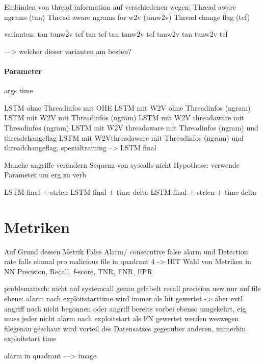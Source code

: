             Einbinden von thread information auf verschiedenen wegen:
            Thread aware ngrams (tan)
            Thread aware ngrams for w2v (tanw2v)
            Thread change flag (tcf)

            varianten:
            tan
            tanw2v
            tcf
            tan tcf
            tan tanw2v
            tcf tanw2v
            tan tanw2v tcf

            ---> welcher dieser varianten am besten?

        \paragraph{Parameter}
            args
            time

            LSTM ohne Threadinfos mit OHE
            LSTM mit W2V ohne Threadinfos (ngram)
            LSTM mit W2V mit Threadinfos (ngram)
            LSTM mit W2V threadaware mit Threadinfos (ngram)
            LSTM mit W2V threadaware mit Threadinfos (ngram) und threadchangeflag
            LSTM mit W2Vthreadaware mit Threadinfos (ngram) und threadchangeflag, spezialtraining
            --> LSTM final

            Manche angriffe verändern Sequenz von syscalls nicht
            Hypothese:
            verwende Parameter um erg zu verb

            LSTM final + strlen
            LSTM final + time delta
            LSTM final + strlen + time delta



\section{Metriken}\label{sec:Metriken}

    Auf Grund dessen Metrik False Alarm/ consecutive false alarm und Detection rate falls einmal pro malicious file in quadrant 4 -> HIT
    Wahl von Metriken in NN
    Precision, Recall, f-score, TNR, FNR, FPR

    problematisch:
    nicht auf systemcall genau gelabelt
    recall precision usw nur auf file ebene:
    alarm nach exploitstarttime wird immer als hit gewertet -> aber evtl angriff noch nicht begonnen
    oder angriff bereits vorbei
    ebenso umgekehrt, eig muss jeder nicht alarm nach exploitstart als FN gewertet werden
    weswegen filegenau geschaut wird
    vorteil des Datensatzes gegenüber anderen, immerhin exploitstart time

    alarm in quadrant ---> image
